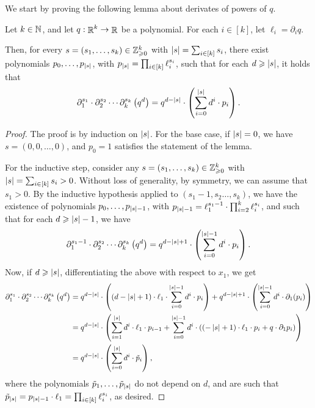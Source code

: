 We start by proving the following lemma about derivates of powers of $q$.
\begin{lemma}\label{lemma:pow_derivatives}
	Let $k\in \mathbb{N}$, and let $q:\mathop{\mathbb{R}}^k\to \mathop{\mathbb{R}}$ be a polynomial. For each $i\in [k]$, let $\ell_i=\partial_iq$.
	
	Then, for every $s=(s_1,\dots,s_k)\in \mathbb{Z}_{\geqslant 0}^k$ with $\left|s\right|=\sum_{i\in [k]}s_i$, there exist  polynomials $p_0, \dots, p_{\left|s\right|}$, with $p_{\left|s\right|} = \prod_{i\in [k]}\ell_i^{s_i}$, such that for each $d\geqslant \left|s\right|$, it holds that 
	\[ \partial_1^{s_1}\cdot\partial_2^{s_2}\cdots \partial_k^{s_k}\left( q^d \right) = q^{d-\left|s\right|}\cdot \left( \sum_{i=0}^{\left|s\right|} d^i\cdot p_i \right).\]
\end{lemma}
\begin{proof}
	The proof is by induction on $\left|s\right|$.
	For the base case, if $\left|s\right|=0$, we have $s = (0,0,\dots,0)$, and $p_0 = 1$ satisfies the statement of the lemma.
	
	For the inductive step, consider any $s=(s_1,\dots,s_k)\in \mathbb{Z}_{\geqslant 0}^k$ with $\left|s\right|=\sum_{i\in [k]}s_i > 0$.
	Without loss of generality, by symmetry, we can assume that $s_1>0$.
	By the inductive hypothesis applied to $(s_1-1,s_2\dots,s_k)$, we have the existence of polynomials $p_0, \dots, p_{\left|s\right|-1}$, with $p_{\left|s\right|-1} = \ell_1^{s_1-1}\cdot \prod_{i=2}^k\ell_i^{s_i}$, and such that for each $d\geqslant \left|s\right|-1$, we have 
	\[ \partial_1^{s_1-1}\cdot\partial_2^{s_2}\cdots \partial_k^{s_k}\left( q^d \right) = q^{d-\left|s\right|+1}\cdot \left( \sum_{i=0}^{\left|s\right|-1} d^i\cdot p_i \right).\]
	Now, if $d\geqslant \left|s\right|$, differentiating the above with respect to $x_1$, we get 
	\begin{align*}
		\partial_1^{s_1}\cdot\partial_2^{s_2}\cdots \partial_k^{s_k}\left( q^d \right) 
		&= q^{d-\left|s\right|}\cdot \left( (d-\left|s\right|+1)\cdot \ell_1\cdot \sum_{i=0}^{\left|s\right|-1} d^i\cdot p_i \right) + q^{d-\left|s\right|+1}\cdot \left( \sum_{i=0}^{\left|s\right|-1} d^i\cdot \partial_1(p_i) \right)
		\\&= q^{d-\left|s\right|}\cdot \left( \sum_{i=1}^{\left|s\right|} d^{i}\cdot \ell_1\cdot p_{i-1} + \sum_{i=0}^{\left|s\right|-1}d^i\cdot \left( \left( -\left|s\right|+1 \right)\cdot \ell_1\cdot p_i + q\cdot \partial_1 p_i \right)  \right)
		\\&= q^{d-\left|s\right|}\cdot \left( \sum_{i=0}^{\left|s\right|} d^{i}\cdot \tilde{p}_i  \right),
	\end{align*}
	where the polynomials $\tilde{p}_1,\dots,\tilde{p}_{\left|s\right|}$ do not depend on $d$, and are such that $\tilde{p}_{\left|s\right|} = p_{\left|s\right|-1}\cdot \ell_1  = \prod_{i\in [k]}\ell_i^{s_i}$, as desired.
\end{proof}

